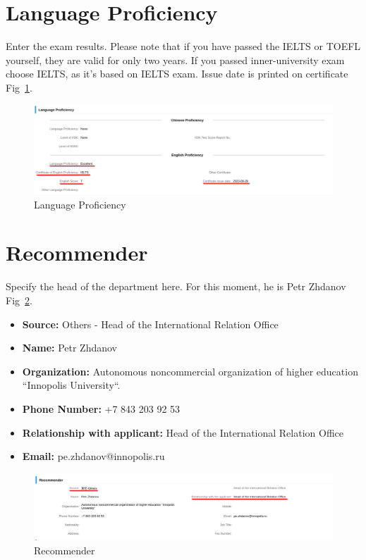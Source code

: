 \section{Language Proficiency}
Enter the exam results.
Please note that if you have passed the IELTS or TOEFL yourself,
they are valid for only two years.
If you passed inner-university exam choose IELTS, as it's based on IELTS exam.
Issue date is printed on certificate Fig~\ref{fig:ru_lang_prof}.


\begin{figure}[H]
    \centering
    \includegraphics[width=\textwidth]{01_russia/imgs/app_5_language}
    \caption{\centering Language Proficiency}
    \label{fig:ru_lang_prof}
\end{figure}









\section{Recommender}
Specify the head of the department here.
For this moment, he is Petr Zhdanov Fig~\ref{fig:ru_recommender}.

\begin{itemize}
    \item \textbf{Source:} Others - Head of the International Relation Office
    \item \textbf{Name:} Petr Zhdanov
    \item \textbf{Organization:} Autonomous noncommercial organization of higher education ``Innopolis University``.
    \item \textbf{Phone Number:} +7 843 203 92 53
    \item \textbf{Relationship with applicant:} Head of the International Relation Office
    \item \textbf{Email:} pe.zhdanov@innopolis.ru
\end{itemize}


\begin{figure}[H]
    \centering
    \includegraphics[width=\textwidth]{01_russia/imgs/app_6_recommender}
    \caption{\centering Recommender}
    \label{fig:ru_recommender}
\end{figure}







